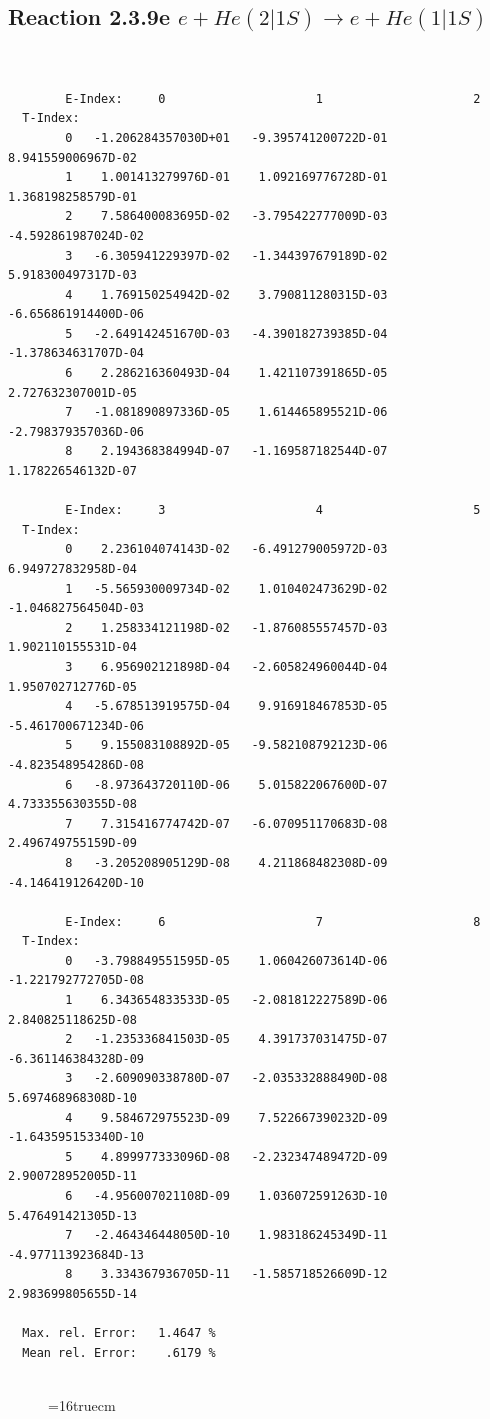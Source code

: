 \documentclass[12pt,dvips]{article}
\begin{document}
\subsection{
Reaction 2.3.9e  $e + He(2|1S) \rightarrow e + He(1|1S) $
}


\begin{small}\begin{verbatim}


        E-Index:     0                     1                     2
  T-Index:
        0   -1.206284357030D+01   -9.395741200722D-01    8.941559006967D-02
        1    1.001413279976D-01    1.092169776728D-01    1.368198258579D-01
        2    7.586400083695D-02   -3.795422777009D-03   -4.592861987024D-02
        3   -6.305941229397D-02   -1.344397679189D-02    5.918300497317D-03
        4    1.769150254942D-02    3.790811280315D-03   -6.656861914400D-06
        5   -2.649142451670D-03   -4.390182739385D-04   -1.378634631707D-04
        6    2.286216360493D-04    1.421107391865D-05    2.727632307001D-05
        7   -1.081890897336D-05    1.614465895521D-06   -2.798379357036D-06
        8    2.194368384994D-07   -1.169587182544D-07    1.178226546132D-07

        E-Index:     3                     4                     5
  T-Index:
        0    2.236104074143D-02   -6.491279005972D-03    6.949727832958D-04
        1   -5.565930009734D-02    1.010402473629D-02   -1.046827564504D-03
        2    1.258334121198D-02   -1.876085557457D-03    1.902110155531D-04
        3    6.956902121898D-04   -2.605824960044D-04    1.950702712776D-05
        4   -5.678513919575D-04    9.916918467853D-05   -5.461700671234D-06
        5    9.155083108892D-05   -9.582108792123D-06   -4.823548954286D-08
        6   -8.973643720110D-06    5.015822067600D-07    4.733355630355D-08
        7    7.315416774742D-07   -6.070951170683D-08    2.496749755159D-09
        8   -3.205208905129D-08    4.211868482308D-09   -4.146419126420D-10

        E-Index:     6                     7                     8
  T-Index:
        0   -3.798849551595D-05    1.060426073614D-06   -1.221792772705D-08
        1    6.343654833533D-05   -2.081812227589D-06    2.840825118625D-08
        2   -1.235336841503D-05    4.391737031475D-07   -6.361146384328D-09
        3   -2.609090338780D-07   -2.035332888490D-08    5.697468968308D-10
        4    9.584672975523D-09    7.522667390232D-09   -1.643595153340D-10
        5    4.899977333096D-08   -2.232347489472D-09    2.900728952005D-11
        6   -4.956007021108D-09    1.036072591263D-10    5.476491421305D-13
        7   -2.464346448050D-10    1.983186245349D-11   -4.977113923684D-13
        8    3.334367936705D-11   -1.585718526609D-12    2.983699805655D-14

  Max. rel. Error:   1.4647 %
  Mean rel. Error:    .6179 %


\end{verbatim}\end{small}
\begin{figure} \label{2.3.9e}
\epsfxsize=16truecm
\end{figure}
\newpage
\end{document}
